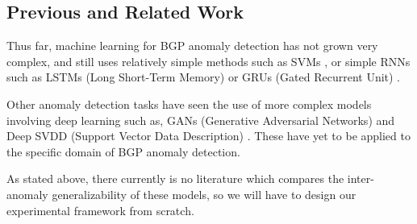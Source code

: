 \subsection{Previous and Related Work}

Thus far, machine learning for BGP anomaly detection has not grown very complex, and still uses relatively simple methods such as SVMs \cite{Scholkopf1998SVMsTheory}, or simple RNNs such as LSTMs (Long Short-Term Memory) \cite{Hochreiter1997LongMemory} or GRUs (Gated Recurrent Unit) \cite{Chung2014EmpiricalModeling}. 

Other anomaly detection tasks have seen the use of more complex models involving deep learning such as, GANs (Generative Adversarial Networks) \cite{goodfellow2014generative} \cite{Ngo2019FenceDetection} and Deep SVDD (Support Vector Data Description) \cite{ocnn-ruff18a}. These have yet to be applied to the specific domain of BGP anomaly detection.

As stated above, there currently is no literature which compares the inter-anomaly generalizability of these models, so we will have to design our experimental framework from scratch. 



